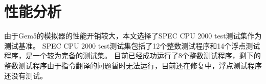 






\section{性能分析}
由于Gem5的模拟器的性能开销较大，本文选择了SPEC CPU 2000 test测试集作为测试基准。
SPEC CPU 2000 test测试集包括了12个整数测试程序和14个浮点测试程序，是一个较为完备的测试集。
目前已经成功运行了8个整数测试程序，剩下的整数测试程序由于指令翻译的问题暂时无法运行，目前还在修复中，浮点测试程序还没有测试。

